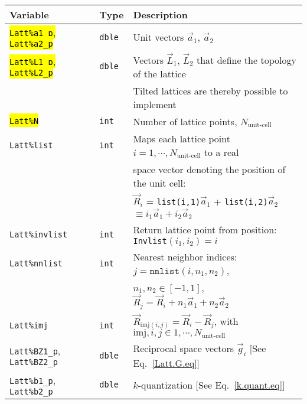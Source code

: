 %
\begin{table}[h!]
	\begin{center}
   \begin{tabular}{@{} l l @{$\;\;$} l @{}}\toprule
    Variable  & Type & Description \\\midrule
     \hl{\texttt{Latt\%a1\_p}, \texttt{Latt\%a2\_p}}   & \texttt{dble}  & Unit vectors $\vec{a}_1$,  $\vec{a}_2$ \\ 
     \hl{\texttt{Latt\%L1\_p}, \texttt{Latt\%L2\_p}}   & \texttt{dble}  & Vectors $\vec{L}_1$, $\vec{L}_2$ that define the topology of the  lattice \\
     									               &                &  Tilted lattices are  thereby possible to implement \\
    \hl{\texttt{Latt\%N}}                              & \texttt{int}   &  Number of lattice points, $N_{\text{unit-cell}}$ \\
    \texttt{Latt\%list}                                & \texttt{int}   &  Maps each lattice point $i=1,\cdots, N_{\text{unit-cell}}$ to a real\\
                                                                    &   &  space vector denoting the position of the unit cell: \\
                                                                    &   & $\vec{R}_i$ = \texttt{list(i,1)}$\vec{a}_1$ + \texttt{list(i,2)}$\vec{a}_2$  $  \equiv i_1  \vec{a}_1 + i_2  \vec{a}_2 $ \\
    \texttt{Latt\%invlist}                             & \texttt{int}   &  Return lattice point from position: \texttt{Invlist}$(i_1,i_2) = i $ \\
    \texttt{Latt\%nnlist}                              & \texttt{int}   &  Nearest neighbor indices: $j = \texttt{nnlist} (i, n_1, n_2) $, \\
                                                       &                &  $n_1, n_2 \in [-1,1] $, $\vec{R}_j = \vec{R}_i + n_1 \vec{a}_1  + n_2 \vec{a}_2 $ \\
   \texttt{Latt\%imj}                                  & \texttt{int}   &  $\vec{R}_{\mathrm{imj}(i,j)}  =  \vec{R}_i -  \vec{R}_j$, with  $\mathrm{imj}, i, j \in  1,\cdots, N_{\text{unit-cell}}$ \\
    \texttt{Latt\%BZ1\_p}, \texttt{Latt\%BZ2\_p}       & \texttt{dble}  & Reciprocal space vectors $\vec{g}_i$   [See Eq.~\eqref{Latt.G.eq}] \\
    \texttt{Latt\%b1\_p}, \texttt{Latt\%b2\_p}          & \texttt{dble}  &  $k$-quantization [See Eq.~\eqref{k.quant.eq}] \\

\end{tabular}
\end{center}
\end{table}
